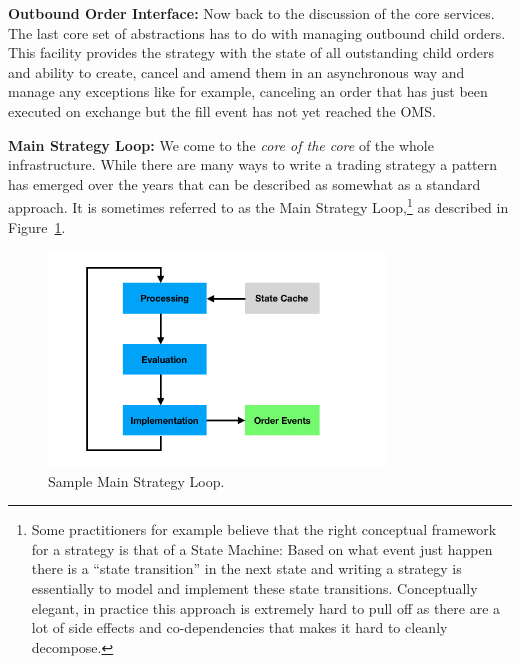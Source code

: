 \noindent\textbf{Outbound Order Interface:} Now back to the discussion of the core services. The last core set of abstractions has to do with managing outbound child orders. This facility provides the strategy with the state of all outstanding child orders and ability to create, cancel and amend them in an asynchronous way and manage any exceptions like for example, canceling an order that has just been executed on exchange but the fill event has not yet reached the OMS. \twomedskip


\noindent\textbf{Main Strategy Loop:} We come to the \emph{core of the core} of the whole infrastructure. While there are many ways to write a trading strategy a pattern has emerged over the years that can be described as somewhat as a standard approach. It is sometimes referred to as the Main Strategy Loop,\footnote{Some practitioners for example believe that the right conceptual framework for a strategy is that of a State Machine: Based on what event just happen there is a ``state transition'' in the next state and writing a strategy is essentially to model and implement these state transitions. Conceptually elegant, in practice this approach is extremely hard to pull off as there are a lot of side effects and co-dependencies that makes it hard to cleanly decompose.} as described in Figure~\ref{fig:MainLoop}. 

	\begin{figure}[!ht]
	\centering
	\includegraphics[width=0.8\textwidth]{chapters/chapter_tech/figures/MainLoop.png} 
	\caption{Sample Main Strategy Loop.\label{fig:MainLoop}}
	\end{figure}
	
